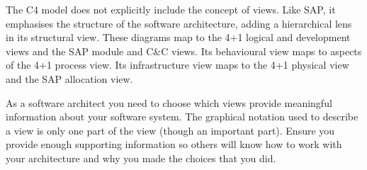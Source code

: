 The C4 model does not explicitly include the concept of views.
Like SAP, it emphasises the structure of the software architecture, adding a hierarchical lens in its structural view.
These diagrams map to the 4+1 logical and development views and the SAP module and C\&C views.
Its behavioural view maps to aspects of the 4+1 process view.
Its infrastructure view maps to the 4+1 physical view and the SAP allocation view.

As a software architect you need to choose which views provide meaningful information about your software system.
The graphical notation used to describe a view is only one part of the view (though an important part).
Ensure you provide enough supporting information so others will know how to work with your architecture and why you made the choices that you did.